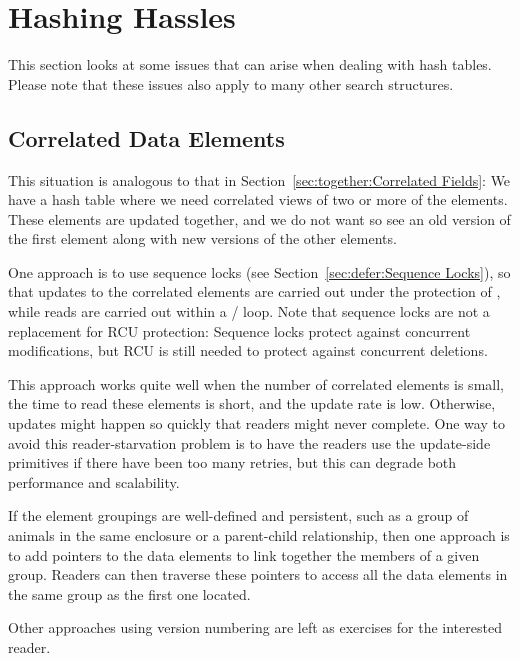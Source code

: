 
\section{Hashing Hassles}
\label{sec:together:Hashing Hassles}

This section looks at some issues that can arise when dealing with
hash tables.
Please note that these issues also apply to many other search structures.

\subsection{Correlated Data Elements}
\label{sec:together:Correlated Data Elements}

This situation is analogous to that in
Section~\ref{sec:together:Correlated Fields}:
We have a hash table where we need correlated views of two or more of
the elements.
These elements are updated together, and we do not want so see an old
version of the first element along with new versions of the other
elements.

One approach is to use sequence locks
(see Section~\ref{sec:defer:Sequence Locks}),
so that updates to the correlated elements are carried out under the
protection of , while reads are carried out within
a  /  loop.
Note that sequence locks are not a replacement for RCU protection:
Sequence locks protect against concurrent modifications, but RCU
is still needed to protect against concurrent deletions.

This approach works quite well when the number of correlated elements is
small, the time to read these elements is short, and the update rate is
low.
Otherwise, updates might happen so quickly that readers might never complete.
One way to avoid this reader-starvation problem is to have the readers
use the update-side primitives if there have been too many retries,
but this can degrade both performance and scalability.

If the element groupings are well-defined and persistent, such as
a group of animals in the same enclosure or a parent-child relationship,
then one approach is to add pointers to the data elements to link
together the members of a given group.
Readers can then traverse these pointers to access all the data elements
in the same group as the first one located.

Other approaches using version numbering are left as exercises for the
interested reader.

